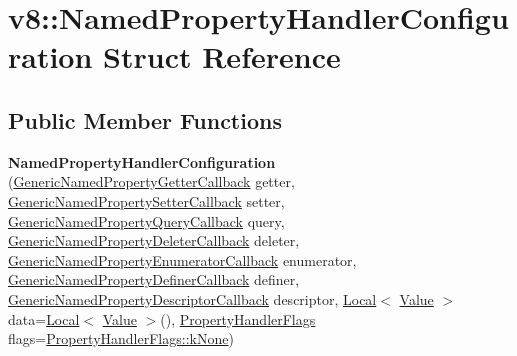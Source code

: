 \hypertarget{structv8_1_1NamedPropertyHandlerConfiguration}{}\section{v8\+:\+:Named\+Property\+Handler\+Configuration Struct Reference}
\label{structv8_1_1NamedPropertyHandlerConfiguration}
\subsection*{Public Member Functions}
\begin{DoxyCompactItemize}
\item 
\mbox{\label{structv8_1_1NamedPropertyHandlerConfiguration_ac3dd6f5e0fcd80b32f6bf43197eda7b5}} 
{\bfseries Named\+Property\+Handler\+Configuration} (\mbox{\hyperlink{namespacev8_a24b1801fa53a7c5a71366d8044927563}{Generic\+Named\+Property\+Getter\+Callback}} getter, \mbox{\hyperlink{namespacev8_af74716c6e95a269c6cd4314662fd0a7e}{Generic\+Named\+Property\+Setter\+Callback}} setter, \mbox{\hyperlink{namespacev8_add9f7ab11e4a9a2b9ad2c4536b0e1a64}{Generic\+Named\+Property\+Query\+Callback}} query, \mbox{\hyperlink{namespacev8_ad2aecc0406ea4bc02d5a4f84a433b273}{Generic\+Named\+Property\+Deleter\+Callback}} deleter, \mbox{\hyperlink{namespacev8_a20826eb7e52e84fa4f632534e8eddd04}{Generic\+Named\+Property\+Enumerator\+Callback}} enumerator, \mbox{\hyperlink{namespacev8_a66c854bc88d612ab4c65354bc0dc74a0}{Generic\+Named\+Property\+Definer\+Callback}} definer, \mbox{\hyperlink{namespacev8_a8cf8faa26baffa84173a24906c0d49f6}{Generic\+Named\+Property\+Descriptor\+Callback}} descriptor, \mbox{\hyperlink{classv8_1_1Local}{Local}}$<$ \mbox{\hyperlink{classv8_1_1Value}{Value}} $>$ data=\mbox{\hyperlink{classv8_1_1Local}{Local}}$<$ \mbox{\hyperlink{classv8_1_1Value}{Value}} $>$(), \mbox{\hyperlink{namespacev8_af4789f0aeb8680e353901a35810cac1a}{Property\+Handler\+Flags}} flags=\mbox{\hyperlink{namespacev8_af4789f0aeb8680e353901a35810cac1aa35c3ace1970663a16e5c65baa5941b13}{Property\+Handler\+Flags\+::k\+None}})
\item 

\end{DoxyCompactItemize}
